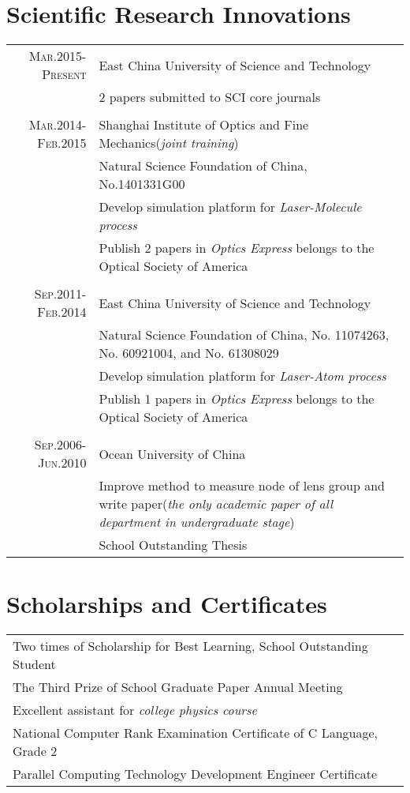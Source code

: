 \documentclass[a4paper,11pt]{article}
\begin{document}
{\section{Scientific Research Innovations}
\begin{tabular}{r|p{12cm}}
 \textsc{Mar.2015-Present}&East China University of Science and Technology  \\
 &\footnotesize{2 papers submitted to SCI core journals}\\\multicolumn{2}{c}{} \\
 \textsc{Mar.2014-Feb.2015}&Shanghai Institute of Optics and Fine Mechanics(\emph{joint training}) \\
 &\footnotesize{Natural Science Foundation of China, No.1401331G00}\\
 &\footnotesize{Develop simulation platform for \emph{Laser-Molecule process}}\\
 &\footnotesize{Publish 2 papers in \emph{Optics Express} belongs to the Optical Society of America}\\\multicolumn{2}{c}{} \\
 \textsc{Sep.2011-Feb.2014}&East China University of Science and Technology \\
 &\footnotesize{Natural Science Foundation of China, No. 11074263, No. 60921004, and No. 61308029}\\
 &\footnotesize{Develop simulation platform for \emph{Laser-Atom process}}\\
 &\footnotesize{Publish 1 papers in \emph{Optics Express} belongs to the Optical Society of America}\\\multicolumn{2}{c}{} \\
\textsc{Sep.2006-Jun.2010}&Ocean University of China\\
 &\footnotesize{Improve method to measure node of lens group and write paper(\emph{the only academic paper of all department in undergraduate stage})}\\
 &\footnotesize{School Outstanding Thesis} 
\end{tabular}
\section{Scholarships and Certificates}
\begin{tabular}{p{15cm}}
Two times of Scholarship for Best Learning, School Outstanding Student\\
The Third Prize of School Graduate Paper Annual Meeting\\
Excellent assistant for \emph{college physics course}\\
National Computer Rank Examination Certificate of C Language, Grade 2\\
Parallel Computing Technology Development Engineer Certificate
\end{tabular}
}
\end{document}
